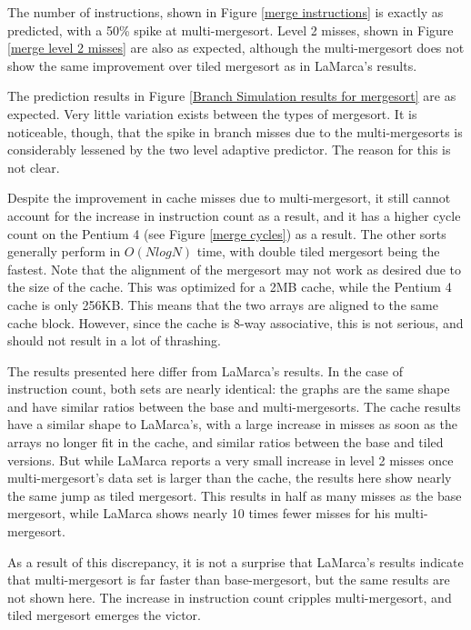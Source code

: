 
The number of instructions, shown in Figure \ref{merge instructions} is exactly
as predicted, with a 50\% spike at multi-mergesort. Level 2 misses, shown in
Figure \ref{merge level 2 misses} are also as expected, although the
multi-mergesort does not show the same improvement over tiled mergesort as in
LaMarca's results.

The prediction results in Figure \ref{Branch Simulation results for mergesort}
are as expected. Very little variation exists between the types of mergesort. It
is noticeable, though, that the spike in branch misses due to the
multi-mergesorts is considerably lessened by the two level adaptive predictor.
The reason for this is not clear.

Despite the improvement in cache misses due to multi-mergesort, it still cannot
account for the increase in instruction count as a result, and it has a higher
cycle count on the Pentium 4 (see Figure \ref{merge cycles}) as a result. The
other sorts generally perform in $O(NlogN)$ time, with double tiled mergesort
being the fastest. Note that the alignment of the mergesort may not work as
desired due to the size of the cache. This was optimized for a 2MB cache, while
the Pentium 4 cache is only 256KB. This means that the two arrays are aligned to
the same cache block. However, since the cache is 8-way associative, this is not
serious, and should not result in a lot of thrashing.

The results presented here differ from LaMarca's results. In the case of
instruction count, both sets are nearly identical: the graphs are the same shape
and have similar ratios between the base and multi-mergesorts. The cache results
have a similar shape to LaMarca's, with a large increase in misses as soon as
the arrays no longer fit in the cache, and similar ratios between the base and
tiled versions.  But while LaMarca reports a very small increase in level 2
misses once multi-mergesort's data set is larger than the cache, the results
here show nearly the same jump as tiled mergesort. This results in half as many
misses as the base mergesort, while LaMarca shows nearly 10 times fewer misses
for his multi-mergesort.

As a result of this discrepancy, it is not a surprise that LaMarca's results
indicate that multi-mergesort is far faster than base-mergesort, but the same
results are not shown here. The increase in instruction count cripples
multi-mergesort, and tiled mergesort emerges the victor.

